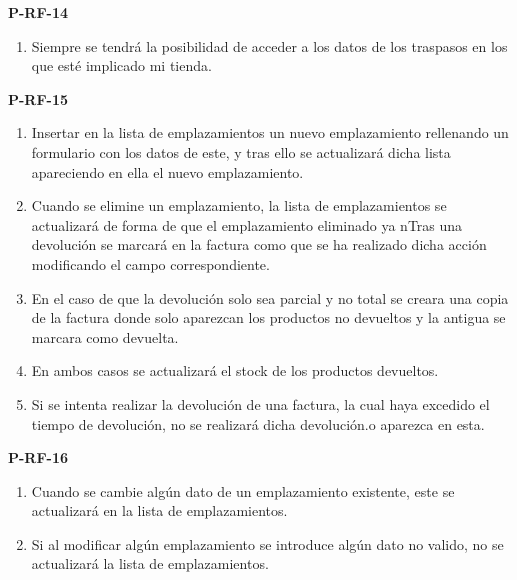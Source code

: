 \textbf{P-RF-14}
\begin{enumerate}
	\item Siempre se tendrá la posibilidad de acceder a los datos de los traspasos en los que esté implicado mi tienda.
\end{enumerate}

\textbf{P-RF-15}
\begin{enumerate}
	\item Insertar en la lista de emplazamientos un nuevo emplazamiento rellenando un formulario con los datos de este, y tras ello se actualizará dicha lista apareciendo en ella el nuevo emplazamiento.
	\item Cuando se elimine un emplazamiento, la lista de emplazamientos se actualizará de forma de que el emplazamiento eliminado ya nTras una devolución se marcará en la factura como que se ha realizado dicha acción modificando el campo correspondiente.
	\item En el caso de que la devolución solo sea parcial y no total se creara una copia de la factura donde solo aparezcan los productos no devueltos y la antigua se marcara como devuelta.
	\item En ambos casos se actualizará el stock de los productos devueltos.
	\item Si se intenta realizar la devolución de una factura, la cual haya excedido el tiempo de devolución, no se realizará dicha devolución.o aparezca en esta.
\end{enumerate}

\textbf{P-RF-16}
\begin{enumerate}
	\item Cuando se cambie algún dato de un emplazamiento existente, este se actualizará en la lista de emplazamientos.
	\item Si al modificar algún emplazamiento se introduce algún dato no valido, no se actualizará la lista de emplazamientos.
\end{enumerate}

